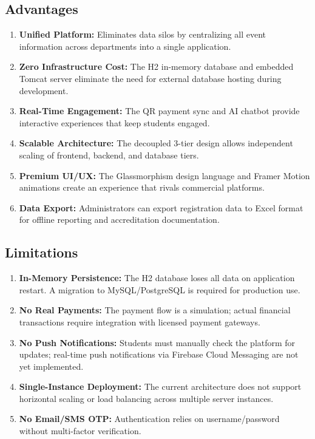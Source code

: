 \subsection{Advantages}
\begin{enumerate}
    \item \textbf{Unified Platform:} Eliminates data silos by centralizing all event information across departments into a single application.
    \item \textbf{Zero Infrastructure Cost:} The H2 in-memory database and embedded Tomcat server eliminate the need for external database hosting during development.
    \item \textbf{Real-Time Engagement:} The QR payment sync and AI chatbot provide interactive experiences that keep students engaged.
    \item \textbf{Scalable Architecture:} The decoupled 3-tier design allows independent scaling of frontend, backend, and database tiers.
    \item \textbf{Premium UI/UX:} The Glassmorphism design language and Framer Motion animations create an experience that rivals commercial platforms.
    \item \textbf{Data Export:} Administrators can export registration data to Excel format for offline reporting and accreditation documentation.
\end{enumerate}

\subsection{Limitations}
\begin{enumerate}
    \item \textbf{In-Memory Persistence:} The H2 database loses all data on application restart. A migration to MySQL/PostgreSQL is required for production use.
    \item \textbf{No Real Payments:} The payment flow is a simulation; actual financial transactions require integration with licensed payment gateways.
    \item \textbf{No Push Notifications:} Students must manually check the platform for updates; real-time push notifications via Firebase Cloud Messaging are not yet implemented.
    \item \textbf{Single-Instance Deployment:} The current architecture does not support horizontal scaling or load balancing across multiple server instances.
    \item \textbf{No Email/SMS OTP:} Authentication relies on username/password without multi-factor verification.
\end{enumerate}
